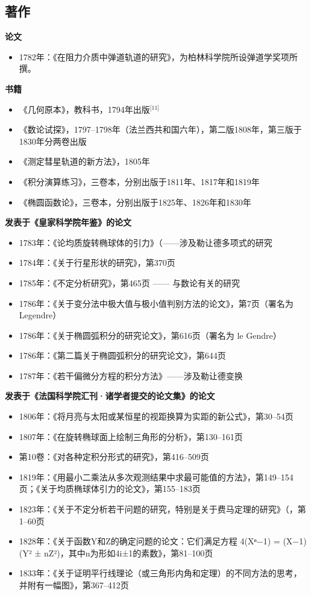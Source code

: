 \subsection{著作}
\textbf{论文}
\begin{itemize}
\item 1782年：《在阻力介质中弹道轨道的研究》，为柏林科学院所设弹道学奖项所撰。
\end{itemize}
\textbf{书籍}
\begin{itemize}
\item 《几何原本》，教科书，1794年出版\(^\text{[11]}\)
\item 《数论试探》，1797–1798年（法兰西共和国六年），第二版1808年，第三版于1830年分两卷出版
\item 《测定彗星轨道的新方法》，1805年
\item 《积分演算练习》，三卷本，分别出版于1811年、1817年和1819年
\item 《椭圆函数论》，三卷本，分别出版于1825年、1826年和1830年
\end{itemize}
\textbf{发表于《皇家科学院年鉴》的论文}
\begin{itemize}
\item 1783年：《论均质旋转椭球体的引力》（——涉及勒让德多项式的研究
\item 1784年：《关于行星形状的研究》，第370页
\item 1785年：《不定分析研究》，第465页 —— 与数论有关的研究
\item 1786年：《关于变分法中极大值与极小值判别方法的论文》，第7页（署名为 Legendre）
\item 1786年：《关于椭圆弧积分的研究论文》，第616页（署名为 le Gendre）
\item 1786年：《第二篇关于椭圆弧积分的研究论文》，第644页
\item 1787年：《若干偏微分方程的积分方法》——涉及勒让德变换
\end{itemize}
\textbf{发表于《法国科学院汇刊·诸学者提交的论文集》的论文}
\begin{itemize}
\item 1806年：《将月亮与太阳或某恒星的视距换算为实距的新公式》，第30–54页
\item 1807年：《在旋转椭球面上绘制三角形的分析》，第130–161页
\item 第10卷：《对各种定积分形式的研究》，第416–509页
\item 1819年：《用最小二乘法从多次观测结果中求最可能值的方法》，第149–154页；《关于均质椭球体引力的论文》，第155–183页
\item 1823年：《关于不定分析若干问题的研究，特别是关于费马定理的研究》（，第1–60页
\item 1828年：《关于函数Y和Z的确定问题的论文：它们满足方程 4(Xⁿ−1) = (X−1)(Y² ± nZ²)，其中n为形如4i±1的素数》，第81–100页
\item 1833年：《关于证明平行线理论（或三角形内角和定理）的不同方法的思考，并附有一幅图》，第367–412页
\end{itemize}

